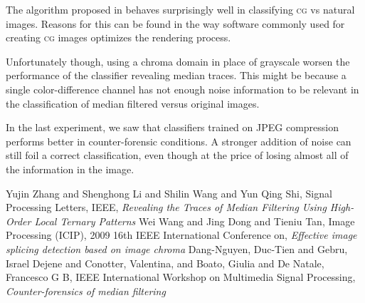 \documentclass[10pt,a4paper]{report}
\begin{document}
The algorithm proposed in \cite{mediantraces} behaves surprisingly well in
classifying \textsc{cg} vs natural images.
Reasons for this can be found in the way software commonly used for creating
\textsc{cg} images optimizes the rendering process.

Unfortunately though, using a chroma domain in place of grayscale
worsen the performance of the classifier revealing median traces. This might be
because a single color-difference channel has not enough noise information to be
relevant in the classification of median filtered versus original images.

\vspace{10pt}

In the last experiment, we saw that classifiers trained on JPEG compression
performs better in counter-forensic conditions.
A stronger addition of noise can still foil a correct classification,
even though at the price of losing almost all of the information in the image.




\begin{thebibliography}{9}
      Yujin Zhang and Shenghong Li and Shilin Wang and Yun Qing Shi,
      Signal Processing Letters, IEEE,
      \emph{Revealing the Traces of Median Filtering Using High-Order
        Local Ternary Patterns}
      Wei Wang and Jing Dong and Tieniu Tan,
      Image Processing (ICIP), 2009 16th IEEE International Conference on,
      \emph{Effective image splicing detection based on image chroma}
      Dang-Nguyen, Duc-Tien and Gebru, Israel Dejene and Conotter, Valentina,
      and Boato, Giulia and De Natale, Francesco G B,
      IEEE International Workshop on Multimedia Signal Processing,
      \emph{Counter-forensics of median filtering}
\end{thebibliography}
\end{document}
